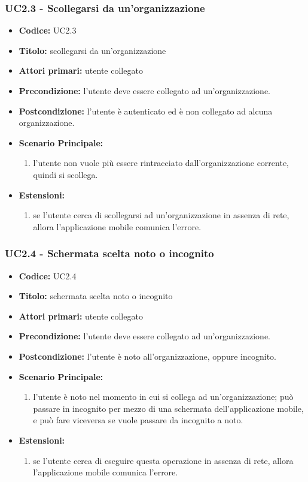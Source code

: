 \documentclass[../analisi-dei-requisiti]{subfiles}
\begin{document}
\subsubsection{UC2.3 - Scollegarsi da un'organizzazione}
\label{sub:uc2.1utente}
\begin{itemize}
  \item \textbf{Codice:} UC2.3
  \item \textbf{Titolo:} scollegarsi da un'organizzazione
  \item \textbf{Attori primari:} utente collegato 
  \item \textbf{Precondizione:} l'utente deve essere collegato ad un'organizzazione.
  \item \textbf{Postcondizione:} l'utente è autenticato ed è non collegato ad alcuna organizzazione.
  \item \textbf{Scenario Principale:}
  \begin{enumerate}
    \item l'utente non vuole più essere rintracciato dall'organizzazione corrente, quindi si scollega.
  \end{enumerate}
  \item \textbf{Estensioni:} 
  \begin{enumerate}
    \item se l'utente cerca di scollegarsi ad un'organizzazione in assenza di rete, allora l'applicazione mobile comunica l'errore.
  \end{enumerate}
\end{itemize}

\subsubsection{UC2.4 - Schermata scelta noto o incognito}
\label{sub:uc2.1utente}
\begin{itemize}
  \item \textbf{Codice:} UC2.4
  \item \textbf{Titolo:} schermata scelta noto o incognito
  \item \textbf{Attori primari:} utente collegato
  \item \textbf{Precondizione:} l'utente deve essere collegato ad un'organizzazione.
  \item \textbf{Postcondizione:} l'utente è noto all'organizzazione, oppure incognito.
  \item \textbf{Scenario Principale:}
  \begin{enumerate}
    \item l'utente è noto nel momento in cui si collega ad un'organizzazione; può passare in incognito per mezzo di una schermata dell'applicazione mobile, e può fare viceversa se vuole passare
    da incognito a noto.
  \end{enumerate}
  \item \textbf{Estensioni:} 
  \begin{enumerate}
    \item se l'utente cerca di eseguire questa operazione in assenza di rete, allora l'applicazione mobile comunica l'errore.
  \end{enumerate}
\end{itemize}
\end{document}

